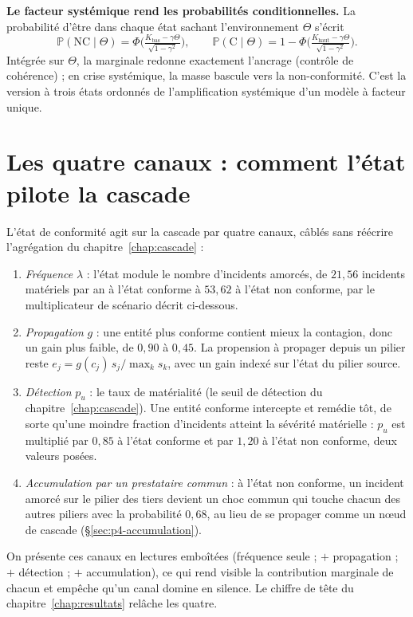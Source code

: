 \begin{cle}
\textbf{Le facteur systémique rend les probabilités conditionnelles.} La probabilité d'être dans
chaque état sachant l'environnement $\Theta$ s'écrit
\begin{equation}
\mathbb P(\text{NC}\mid\Theta)=\Phi\!\Big(\tfrac{K_{\text{bas}}-\gamma\Theta}{\sqrt{1-\gamma^2}}\Big),
\qquad
\mathbb P(\text{C}\mid\Theta)=1-\Phi\!\Big(\tfrac{K_{\text{haut}}-\gamma\Theta}{\sqrt{1-\gamma^2}}\Big).
\end{equation}
Intégrée sur $\Theta$, la marginale redonne exactement l'ancrage (contrôle de cohérence) ; en
crise systémique, la masse bascule vers la non-conformité. C'est la version à trois états
ordonnés de l'amplification systémique d'un modèle à facteur unique.
\end{cle}



\section{Les quatre canaux : comment l'état pilote la cascade}
\label{sec:quatre-canaux}

L'état de conformité agit sur la cascade par quatre canaux, câblés sans réécrire
l'agrégation du chapitre~\ref{chap:cascade} :
\begin{enumerate}[leftmargin=1.5em,itemsep=2pt,topsep=2pt]
\item \emph{Fréquence} $\lambda$ : l'état module le nombre d'incidents amorcés, de $21{,}56$
  incidents matériels par an à l'état conforme à $53{,}62$ à l'état non conforme, par le
  multiplicateur de scénario décrit ci-dessous.
\item \emph{Propagation} $g$ : une entité plus conforme contient mieux la contagion, donc un
  gain plus faible, de $0{,}90$ à $0{,}45$. La propension à propager depuis un pilier reste
  $e_j=g(c_j)\,s_j/\max_k s_k$, avec un gain indexé sur l'état du pilier source.
\item \emph{Détection} $p_u$ : le taux de matérialité (le seuil de détection du
  chapitre~\ref{chap:cascade}). Une entité conforme intercepte et remédie tôt, de sorte qu'une
  moindre fraction d'incidents atteint la sévérité matérielle : $p_u$ est multiplié par $0{,}85$
  à l'état conforme et par $1{,}20$ à l'état non conforme, deux valeurs posées.
\item \emph{Accumulation par un prestataire commun} : à l'état non conforme, un incident amorcé
  sur le pilier des tiers devient un choc commun qui touche chacun des autres piliers avec la
  probabilité $0{,}68$, au lieu de se propager comme un nœud de cascade (\S\ref{sec:p4-accumulation}).
\end{enumerate}
On présente ces canaux en lectures emboîtées (fréquence seule ; $+$ propagation ; $+$
détection ; $+$ accumulation), ce qui rend visible la contribution marginale de chacun et
empêche qu'un canal domine en silence. Le chiffre de tête du chapitre~\ref{chap:resultats}
relâche les quatre.

